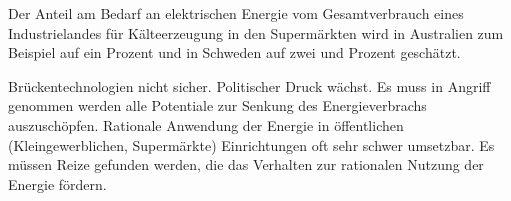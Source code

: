 Der Anteil am Bedarf an elektrischen Energie vom Gesamtverbrauch eines
Industrielandes für Kälteerzeugung in den Supermärkten wird in Australien zum
Beispiel auf ein Prozent \cite[Seite 8]{australia} und in Schweden auf zwei
\cite[Seite 6]{doctor} und \cite{EANRW} Prozent geschätzt.

Brückentechnologien nicht sicher. Politischer Druck wächst. Es muss in Angriff
genommen werden alle Potentiale zur Senkung des Energieverbrachs auszuschöpfen.
Rationale Anwendung der Energie in öffentlichen (Kleingewerblichen, Supermärkte)
Einrichtungen oft sehr schwer umsetzbar. Es müssen Reize gefunden werden, die
das Verhalten zur rationalen Nutzung der Energie fördern.

